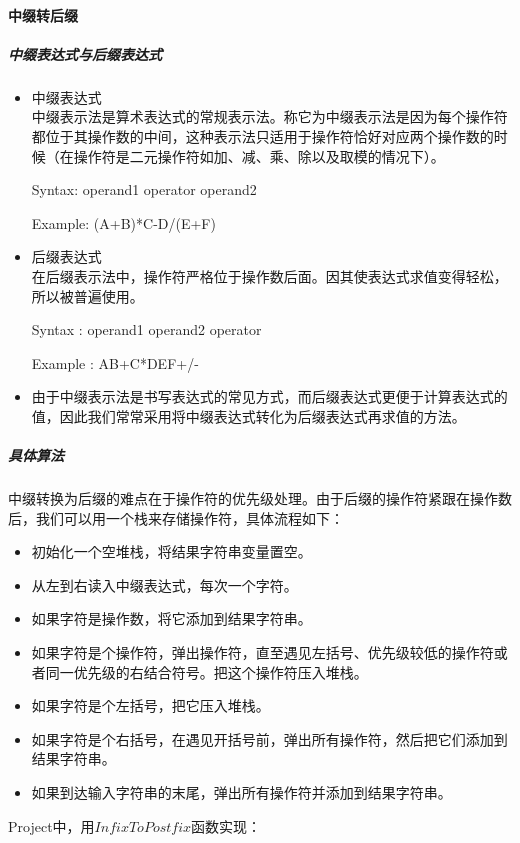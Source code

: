 \paragraph{中缀转后缀\\}
	\subparagraph{中缀表达式与后缀表达式}
		\begin{itemize}
			\item{中缀表达式\\} 
			中缀表示法是算术表达式的常规表示法。称它为中缀表示法是因为每个操作符都位于其操作数的中间，这种表示法只适用于操作符恰好对应两个操作数的时候（在操作符是二元操作符如加、减、乘、除以及取模的情况下）。

			Syntax: operand1 operator operand2
			
			Example: (A+B)*C-D/(E+F)
			
			\item{后缀表达式\\}
			在后缀表示法中，操作符严格位于操作数后面。因其使表达式求值变得轻松，所以被普遍使用。

			Syntax  : operand1 operand2 operator
			
			Example : AB+C*DEF+/-
			\item	由于中缀表示法是书写表达式的常见方式，而后缀表达式更便于计算表达式的值，因此我们常常采用将中缀表达式转化为后缀表达式再求值的方法。
		\end{itemize}
	\subparagraph{具体算法\\}
	中缀转换为后缀的难点在于操作符的优先级处理。由于后缀的操作符紧跟在操作数后，我们可以用一个栈来存储操作符，具体流程如下：
	\begin{itemize}
		\item	初始化一个空堆栈，将结果字符串变量置空。
		\item	从左到右读入中缀表达式，每次一个字符。
		\item	如果字符是操作数，将它添加到结果字符串。
		\item	如果字符是个操作符，弹出操作符，直至遇见左括号、优先级较低的操作符或者同一优先级的右结合符号。把这个操作符压入堆栈。
		\item	如果字符是个左括号，把它压入堆栈。
		\item	如果字符是个右括号，在遇见开括号前，弹出所有操作符，然后把它们添加到结果字符串。
		
		\item	如果到达输入字符串的末尾，弹出所有操作符并添加到结果字符串。
	
	\end{itemize}
	
	Project中，用$InfixToPostfix$函数实现：
		
